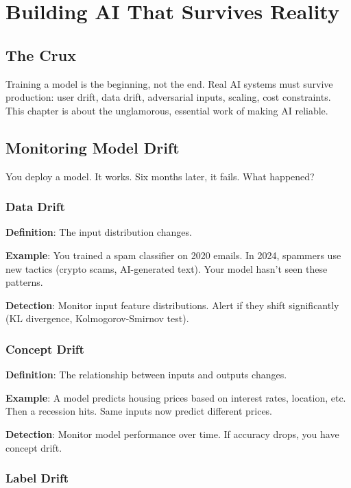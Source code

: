\chapter{Building AI That Survives Reality}

\section{The Crux}
Training a model is the beginning, not the end. Real AI systems must survive production: user drift, data drift, adversarial inputs, scaling, cost constraints. This chapter is about the unglamorous, essential work of making AI reliable.

\section{Monitoring Model Drift}

You deploy a model. It works. Six months later, it fails. What happened?

\subsection{Data Drift}

\textbf{Definition}: The input distribution changes.

\textbf{Example}: You trained a spam classifier on 2020 emails. In 2024, spammers use new tactics (crypto scams, AI-generated text). Your model hasn't seen these patterns.

\textbf{Detection}: Monitor input feature distributions. Alert if they shift significantly (KL divergence, Kolmogorov-Smirnov test).

\subsection{Concept Drift}

\textbf{Definition}: The relationship between inputs and outputs changes.

\textbf{Example}: A model predicts housing prices based on interest rates, location, etc. Then a recession hits. Same inputs now predict different prices.

\textbf{Detection}: Monitor model performance over time. If accuracy drops, you have concept drift.

\subsection{Label Drift}

